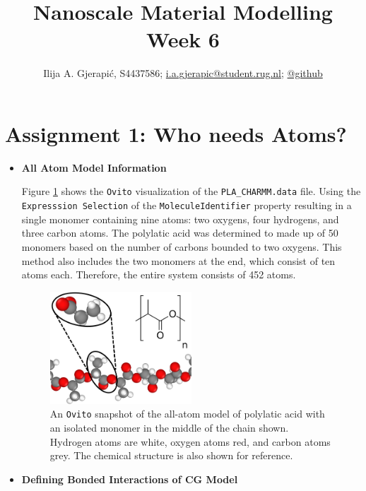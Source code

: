 \documentclass[10pt,a4paper]{labreport}
\title{Nanoscale Material Modelling
\\
\normalsize{Week 6}} %
\author{Ilija A. Gjerapić, S4437586; \href{mailto:i.a.gjerapic@student.rug.nl}{i.a.gjerapic@student.rug.nl}; \href{https://github.com/igjerapic/nmm-week1/}{@github} } %
\begin{document}
\maketitle
\tableofcontents


  

\thispagestyle{firststyle}
\newpage
\section{Assignment 1: Who needs Atoms?}
\begin{itemize}
  \item[\textbf{1(a)}] \textbf{All Atom Model Information}
  
  Figure \ref{fig:ass1_PLA} shows the \texttt{Ovito} visualization of the \texttt{PLA\_CHARMM.data} file. Using the \texttt{Expresssion Selection} of the \texttt{MoleculeIdentifier} property resulting in a single monomer containing nine atoms: two oxygens, four hydrogens, and three carbon atoms. 
  The polylatic acid was determined to made up of 50 monomers based on the number of carbons bounded to two oxygens. This method also includes the two monomers at the end, which consist of ten atoms each. Therefore, the entire system consists of 452 atoms.   
  \begin{figure}[h]
    \centering 
    \includegraphics[width = 0.5\textwidth]{figs/ass1_PLA.png}
    \caption{An \texttt{Ovito} snapshot of the all-atom model of polylatic acid with an isolated monomer in the middle of the chain shown. Hydrogen atoms are white, oxygen atoms red, and carbon atoms grey. The chemical structure is also shown for reference.}
    \label{fig:ass1_PLA}
  \end{figure}

  \item[\textbf{1(b)}] \textbf{Defining Bonded Interactions of CG Model}
  

\end{itemize}
\end{document}
